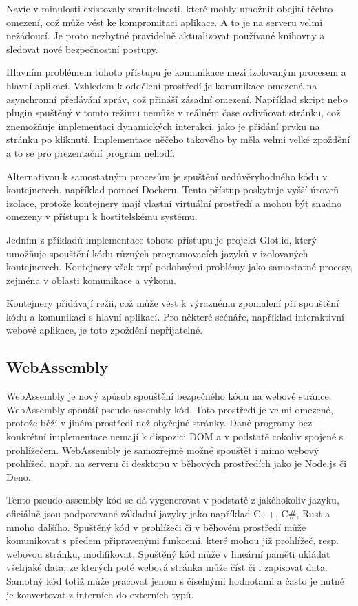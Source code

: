 Navíc v minulosti existovaly zranitelnosti, které mohly umožnit obejití těchto omezení, což může vést ke kompromitaci aplikace.
A to je na serveru velmi nežádoucí.
Je proto nezbytné pravidelně aktualizovat používané knihovny a sledovat nové bezpečnostní postupy.

Hlavním problémem tohoto přístupu je komunikace mezi izolovaným procesem a hlavní aplikací. 
Vzhledem k oddělení prostředí je komunikace omezená na asynchronní předávání zpráv, což přináší zásadní omezení. 
Například skript nebo plugin spuštěný v tomto režimu nemůže v reálném čase ovlivňovat stránku, což znemožňuje implementaci dynamických interakcí, jako je přidání prvku na stránku po kliknutí. 
Implementace něčeho takového by měla velmi velké zpoždění a to se pro prezentační program nehodí.

Alternativou k samostatným procesům je spuštění nedůvěryhodného kódu v kontejnerech, například pomocí Dockeru. 
Tento přístup poskytuje vyšší úroveň izolace, protože kontejnery mají vlastní virtuální prostředí a mohou být snadno omezeny v přístupu k hostitelskému systému.

Jedním z příkladů implementace tohoto přístupu je projekt Glot.io, který umožňuje spouštění kódu různých programovacích jazyků v izolovaných kontejnerech. 
Kontejnery však trpí podobnými problémy jako samostatné procesy, zejména v oblasti komunikace a výkonu. 

Kontejnery přidávají režii, což může vést k výraznému zpomalení při spouštění kódu a komunikaci s hlavní aplikací. 
Pro některé scénáře, například interaktivní webové aplikace, je toto zpoždění nepřijatelné.


\subsection{WebAssembly}\label{text:webassembly}

WebAssembly je nový způsob spouštění bezpečného kódu na webové stránce.
WebAssembly spouští pseudo-assembly kód.
Toto prostředí je velmi omezené, protože běží v jiném prostředí než obyčejné stránky.
Dané programy bez konkrétní implementace nemají k dispozici DOM a v podstatě cokoliv spojené s prohlížečem.
WebAssembly je samozřejmě možné spouštět i mimo webový prohlížeč, např. na serveru či desktopu v běhových prostředích jako je Node.js či Deno.

Tento pseudo-assembly kód se dá vygenerovat v podstatě z jakéhokoliv jazyku, oficiálně jsou podporované základní jazyky jako například C++, C\#, Rust a mnoho dalšího.
Spuštěný kód v prohlížeči či v běhovém prostředí může komunikovat s předem připravenými funkcemi, které mohou již prohlížeč, resp. webovou stránku, modifikovat.
Spuštěný kód může v lineární paměti ukládat všelijaké data, ze kterých poté webová stránka může číst či i zapisovat data.
Samotný kód totiž může pracovat jenom s číselnými hodnotami a často je nutné je konvertovat z interních do externích typů.

